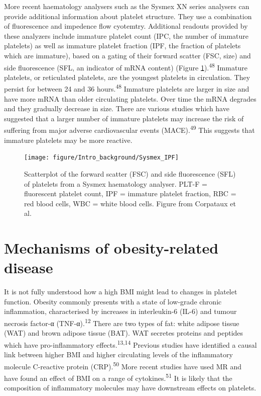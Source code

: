 \documentclass[11pt,twoside]{bristolthesis}
\begin{document}
More recent haematology analysers such as the Sysmex XN series analysers can provide additional information about platelet structure. They use a combination of fluorescence and impedence flow cyotemtry. Additional readouts provided by these analyzers include immature platelet count (IPC, the number of immature platelets) as well as immature platelet fraction (IPF, the fraction of platelets which are immature), based on a gating of their forward scatter (FSC, size) and side fluorescence (SFL, an indicator of mRNA content) (Figure \ref{fig:sysmex-ipf}).\textsuperscript{48} Immature platelets, or reticulated platelets, are the youngest platelets in circulation. They persist for between 24 and 36 hours.\textsuperscript{48} Immature platelets are larger in size and have more mRNA than older circulating platelets. Over time the mRNA degrades and they gradually decrease in size. There are various studies which have suggested that a larger number of immature platelets may increase the risk of suffering from major adverse cardiovascular events (MACE).\textsuperscript{49} This suggests that immature platelets may be more reactive.
\begin{figure}
\texttt{[image: figure/Intro\_background/Sysmex\_IPF]} \caption[Scatterplot of the forward scatter and side flourescence of platelets and immature platelets from a Sysmex analyzer]{Scatterplot of the forward scatter (FSC) and side fluorescence (SFL) of platelets from a Sysmex haematology analyser. PLT-F = fluorescent platelet count, IPF = immature platelet fraction, RBC = red blood cells, WBC = white blood cells. Figure from Corpataux et al.}\label{fig:sysmex-ipf}
\end{figure}
\hypertarget{mechanisms-of-obesity-related-disease}{%
\section{Mechanisms of obesity-related disease}\label{mechanisms-of-obesity-related-disease}}

It is not fully understood how a high BMI might lead to changes in platelet function. Obesity commonly presents with a state of low-grade chronic inflammation, characterised by increases in interleukin-6 (IL-6) and tumour necrosis factor-α (TNF-α).\textsuperscript{12} There are two types of fat: white adipose tissue (WAT) and brown adipose tissue (BAT). WAT secretes proteins and peptides which have pro-inflammatory effects.\textsuperscript{13,14} Previous studies have identified a causal link between higher BMI and higher circulating levels of the inflammatory molecule C-reactive protein (CRP).\textsuperscript{50} More recent studies have used MR and have found an effect of BMI on a range of cytokines.\textsuperscript{51} It is likely that the composition of inflammatory molecules may have downstream effects on platelets.
\end{document}

